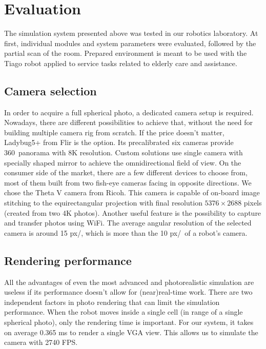\documentclass{svproc}
\begin{document}
\section{Evaluation}
\label{sec:evaluation}

The simulation system presented above was tested in our robotics laboratory. At first, individual modules
and system parameters were evaluated, followed by the partial scan of the room. Prepared environment is 
meant to be used with the Tiago robot applied to service tasks related to elderly care and assistance.

\subsection{Camera selection}

In order to acquire a full spherical photo, a dedicated camera setup is required. Nowadays, there are different 
possibilities to achieve that, without the need for building multiple camera rig from scratch. If the price 
doesn't matter, Ladybug5+ from Flir is the option. Its precalibrated six cameras provide 360\textdegree\ 
panorama with 8K resolution. Custom solutions use single camera with specially shaped mirror \cite{wkasik2017embedded}
to achieve the omnidirectional field of view. On the consumer side of the market, there are a few different devices to choose from,
most of them built from two fish-eye cameras facing in opposite directions. We chose the Theta V camera from Ricoh. 
This camera is capable of on-board image stitching to the equirectangular projection with final resolution
$5376\times2688$ pixels (created from two 4K photos). Another useful feature is the possibility to capture
and transfer photos using WiFi. The average angular resolution of the selected camera is around 15 px/\textdegree, 
which is more than the 10 px/\textdegree\ of a robot's camera. 

\subsection{Rendering performance}

All the advantages of even the most advanced and photorealistic simulation are useless if its performance 
doesn't allow for (near)real-time work. There are two independent factors in photo rendering that can limit
the simulation performance. When the robot moves inside a single cell (in range of a single spherical
photo), only the rendering time is important. For our system, it takes on average 0.365 ms to
render a single VGA view. This allows us to simulate the camera with 2740 FPS.
\end{document}
